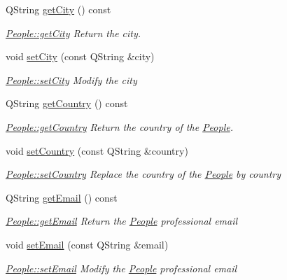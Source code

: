\begin{DoxyCompactItemize}
Q\+String \hyperlink{classModels_1_1People_a478528b88890758e11887f9d48372680}{get\+City} () const 
\begin{DoxyCompactList}\small\item\em \hyperlink{classModels_1_1People_a478528b88890758e11887f9d48372680}{People\+::get\+City} Return the city. \end{DoxyCompactList}\item 
void \hyperlink{classModels_1_1People_ab19eae39212a096542ed8c24567f3ca9}{set\+City} (const Q\+String \&city)
\begin{DoxyCompactList}\small\item\em \hyperlink{classModels_1_1People_ab19eae39212a096542ed8c24567f3ca9}{People\+::set\+City} Modify the {\itshape city} \end{DoxyCompactList}\item 
Q\+String \hyperlink{classModels_1_1People_a0df66681e0b8fcf099ad0a05863a8e13}{get\+Country} () const 
\begin{DoxyCompactList}\small\item\em \hyperlink{classModels_1_1People_a0df66681e0b8fcf099ad0a05863a8e13}{People\+::get\+Country} Return the country of the \hyperlink{classModels_1_1People}{People}. \end{DoxyCompactList}\item 
void \hyperlink{classModels_1_1People_a3062f5f760ee85553b28b3ef1f15492a}{set\+Country} (const Q\+String \&country)
\begin{DoxyCompactList}\small\item\em \hyperlink{classModels_1_1People_a3062f5f760ee85553b28b3ef1f15492a}{People\+::set\+Country} Replace the country of the \hyperlink{classModels_1_1People}{People} by {\itshape country} \end{DoxyCompactList}\item 
Q\+String \hyperlink{classModels_1_1People_a183e3ac09f44e38b32d7ba72aef85757}{get\+Email} () const 
\begin{DoxyCompactList}\small\item\em \hyperlink{classModels_1_1People_a183e3ac09f44e38b32d7ba72aef85757}{People\+::get\+Email} Return the \hyperlink{classModels_1_1People}{People} professional {\itshape email} \end{DoxyCompactList}\item 
void \hyperlink{classModels_1_1People_a731376949fa1d08e87c7c6ab53f792ab}{set\+Email} (const Q\+String \&email)
\begin{DoxyCompactList}\small\item\em \hyperlink{classModels_1_1People_a731376949fa1d08e87c7c6ab53f792ab}{People\+::set\+Email} Modify the \hyperlink{classModels_1_1People}{People} professional {\itshape email} \end{DoxyCompactList}\item 

\end{DoxyCompactItemize}
